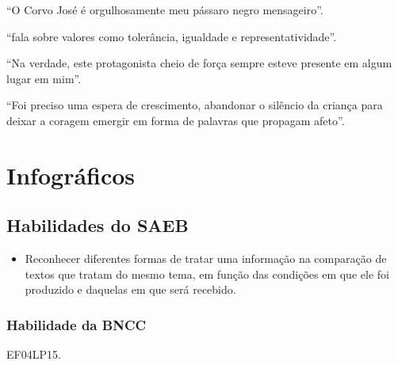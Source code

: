 \begin{escolha}
\item ``O Corvo José é orgulhosamente meu pássaro negro mensageiro''.

\item ``fala sobre
valores como tolerância, igualdade e representatividade''.

\item ``Na verdade, este protagonista cheio de força sempre esteve
presente em algum lugar em mim''.

\item ``Foi preciso uma espera de crescimento, abandonar o silêncio da
criança para deixar a coragem emergir em forma de palavras que propagam
afeto''.
\end{escolha}

\pagebreak

\chapter{Infográficos}

\section*{Habilidades do SAEB}

\begin{itemize}
  \item Reconhecer diferentes formas de tratar uma informação na comparação 
  de textos que tratam do mesmo tema, em função das condições em que ele foi
  produzido e daquelas em que será recebido.
\end{itemize}

\subsection{Habilidade da BNCC}
EF04LP15.


